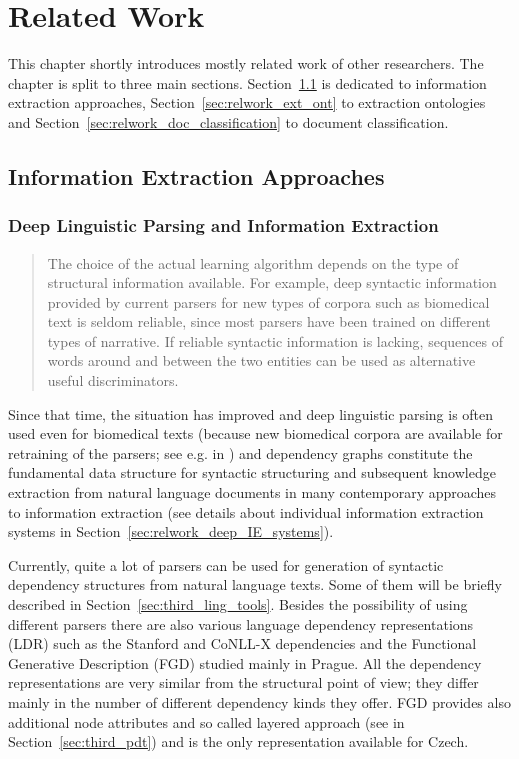 \chapter{Related Work} \label{sec:ch_related}

This chapter shortly introduces mostly related work of other researchers. The chapter is split to three main sections. Section~\ref{sec:relwork_ie} is dedicated to information extraction approaches, Section~\ref{sec:relwork_ext_ont} to extraction ontologies and Section~\ref{sec:relwork_doc_classification} to document classification.

\section{Information Extraction Approaches} \label{sec:relwork_ie}

\subsection{Deep Linguistic Parsing and Information Extraction}

\begin{quotation}
The choice of the actual learning algorithm depends on the type of structural information available. For example, deep syntactic information provided by current parsers for new types of corpora such as biomedical text is seldom reliable, since most parsers have been trained on different types of narrative. If reliable syntactic information is lacking, sequences of words around and between the two entities can be used as alternative useful discriminators. \citep{Bunescu:phd}
\end{quotation}
Since that time, the situation has improved and deep linguistic parsing is often used even for biomedical texts (because new biomedical corpora are available for retraining of the parsers; see e.g. in \citep{Buyko:2010:EIA:1870658.1870754}) and  dependency graphs constitute the fundamental data structure for syntactic structuring and subsequent knowledge extraction from natural language documents in many contemporary approaches to information extraction (see details about individual information extraction systems in Section~\ref{sec:relwork_deep_IE_systems}). 

Currently, quite a lot of parsers can be used for generation of syntactic dependency structures from natural language texts. Some of them will be briefly described in Section~\ref{sec:third_ling_tools}. Besides the possibility of using different parsers there are also various language dependency representations (LDR) such as the Stanford \citep{stanfordDeps} and CoNLL-X \citep{johansson2007a} dependencies and the Functional Generative Description (FGD) \citep{SgallHajicovaPanevova1986} studied mainly in Prague. All the dependency representations are very similar from the structural point of view; they differ mainly in the number of different dependency kinds they offer. FGD provides also additional node attributes and so called layered approach (see in Section~\ref{sec:third_pdt}) and is the only representation available for Czech.


